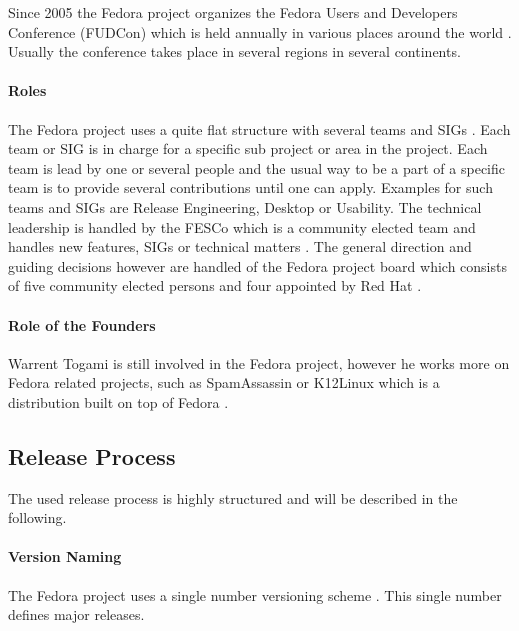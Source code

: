 Since 2005 the Fedora project organizes the Fedora Users and Developers
Conference (FUDCon) which is held annually in various places around the world
\cite{FedoraFUDCon}. Usually the conference takes place in several regions in
several continents.

\paragraph{Roles}

The Fedora project uses a quite flat structure with several teams and \acp{SIG}
\cite{FedoraJoin,FedoraCommunicating,FedoraSIG}. Each team or \ac{SIG} is in
charge for a specific sub project or area in the project. Each team is lead by
one or several people and the usual way to be a part of a specific team is to
provide several contributions until one can apply. Examples for such teams and
\acp{SIG} are Release Engineering, Desktop or Usability. The technical
leadership is handled by the \ac{FESCo} which is a community elected team and
handles new features, \acp{SIG} or technical matters \cite{FedoraFESCo}. The
general direction and guiding decisions however are handled of the Fedora
project board which consists of five community elected persons and four
appointed by Red Hat \cite{FedoraBoard}.

\paragraph{Role of the Founders}

Warrent Togami is still involved in the Fedora project, however he works more
on Fedora related projects, such as SpamAssassin or K12Linux which is a
distribution built on top of Fedora \cite{FedoraTogami}.

\subsection{Release Process}

The used release process is highly structured and will be described in the
following.

\paragraph{Version Naming}

The Fedora project uses a single number versioning scheme
\cite{FedoraHistoricalSchedules,FedoraLifeCycle}. This single number defines
major releases.

